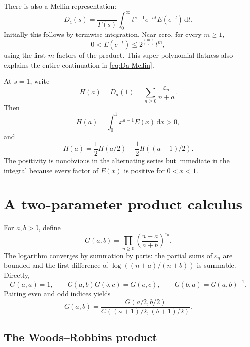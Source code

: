 \documentclass[11pt,oneside]{article}
\numberwithin{equation}{section}
\theoremstyle{definition}
\theoremstyle{remark}
\newcommand{\eps}{\varepsilon}
\newcommand{\dd}{\,\mathrm d}
\begin{document}
There is also a Mellin representation:
\begin{equation}
 \boxed{D_a(s)=\frac1{\Gamma(s)}\int_0^\infty
 t^{s-1}e^{-at}E(e^{-t})\dd t.}
 \label{eq:Da-Mellin}
\end{equation}
Initially this follows by termwise integration.  Near zero, for every
\(m\ge1\),
\begin{equation}
 0<E(e^{-t})\le 2^{\binom m2}t^m,
 \label{eq:E-small-t-flat}
\end{equation}
using the first \(m\) factors of the product.  This super-polynomial flatness
also explains the entire continuation in \eqref{eq:Da-Mellin}.

At \(s=1\), write
\begin{equation}
 H(a)=D_a(1)=\sum_{n\ge0}\frac{\eps_n}{n+a}.
 \label{eq:H-def}
\end{equation}
Then
\begin{equation}
 \boxed{H(a)=\int_0^1x^{a-1}E(x)\dd x>0,}
 \label{eq:H-integral}
\end{equation}
and
\begin{equation}
 H(a)=\frac12H(a/2)-\frac12H((a+1)/2).
 \label{eq:H-functional}
\end{equation}
The positivity is nonobvious in the alternating series but immediate in the
integral because every factor of \(E(x)\) is positive for \(0<x<1\).

\section{A two-parameter product calculus}
\label{sec:infinite-products}

For \(a,b>0\), define
\begin{equation}
 G(a,b)=\prod_{n\ge0}
 \left(\frac{n+a}{n+b}\right)^{\eps_n}.
 \label{eq:G-def}
\end{equation}
The logarithm converges by summation by parts: the partial sums of \(\eps_n\)
are bounded and the first difference of
\(\log((n+a)/(n+b))\) is summable.  Directly,
\begin{equation}
 G(a,a)=1,\qquad G(a,b)G(b,c)=G(a,c),\qquad
 G(b,a)=G(a,b)^{-1}.
 \label{eq:G-cocycle}
\end{equation}
Pairing even and odd indices yields
\begin{equation}
 \boxed{G(a,b)=
 \frac{G(a/2,b/2)}{G((a+1)/2,(b+1)/2)}.}
 \label{eq:G-functional}
\end{equation}

\subsection{The Woods--Robbins product}
\end{document}
